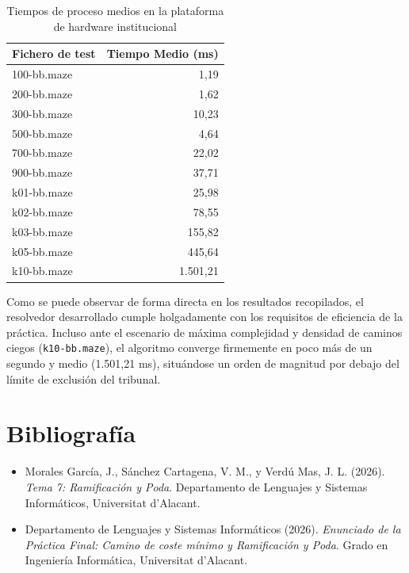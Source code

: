 \documentclass[11pt,a4paper]{article}
\begin{document}
\begin{table}[H]
\centering
\small
\caption{Tiempos de proceso medios en la plataforma de hardware institucional}
\label{tab:tiempos_finales}
\begin{tabular}{l @{\hspace{3cm}} r}
\toprule
\textbf{Fichero de test} & \textbf{Tiempo Medio (ms)} \\
\midrule
100-bb.maze   & 1,19     \\
200-bb.maze   & 1,62     \\
300-bb.maze   & 10,23    \\
500-bb.maze   & 4,64     \\
700-bb.maze   & 22,02    \\
900-bb.maze   & 37,71    \\
k01-bb.maze   & 25,98    \\
k02-bb.maze   & 78,55    \\
k03-bb.maze   & 155,82   \\
k05-bb.maze   & 445,64   \\
k10-bb.maze   & 1.501,21 \\
\bottomrule
\end{tabular}
\end{table}

Como se puede observar de forma directa en los resultados recopilados, el resolvedor desarrollado cumple holgadamente con los requisitos de eficiencia de la práctica. Incluso ante el escenario de máxima complejidad y densidad de caminos ciegos (\texttt{k10-bb.maze}), el algoritmo converge firmemente en poco más de un segundo y medio (1.501,21 ms), situándose un orden de magnitud por debajo del límite de exclusión del tribunal.

\newpage
\section*{Bibliografía}

\begin{itemize}
    \item[1.] Morales García, J., Sánchez Cartagena, V. M., y Verdú Mas, J. L. (2026). \textit{Tema 7: Ramificación y Poda}. Departamento de Lenguajes y Sistemas Informáticos, Universitat d'Alacant.
    \item[2.] Departamento de Lenguajes y Sistemas Informáticos (2026). \textit{Enunciado de la Práctica Final: Camino de coste mínimo y Ramificación y Poda}. Grado en Ingeniería Informática, Universitat d'Alacant.
\end{itemize}
\end{document}
